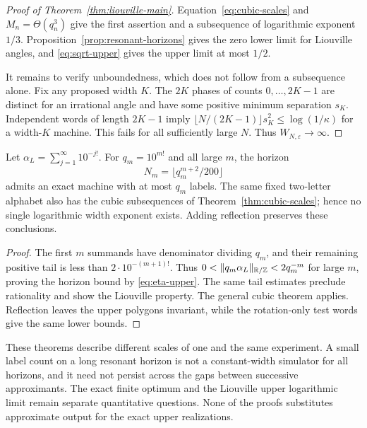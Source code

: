 \begin{proof}[Proof of Theorem~\ref{thm:liouville-main}]
Equation~\eqref{eq:cubic-scales} and $M_n=\Theta(q_n^3)$ give the first assertion and a subsequence of logarithmic exponent $1/3$. Proposition~\ref{prop:resonant-horizons} gives the zero lower limit for Liouville angles, and \eqref{eq:sqrt-upper} gives the upper limit at most $1/2$.

It remains to verify unboundedness, which does not follow from a subsequence alone. Fix any proposed width $K$. The $2K$ phases of counts $0,\ldots,2K-1$ are distinct for an irrational angle and have some positive minimum separation $s_K$. Independent words of length $2K-1$ imply
$\lfloor N/(2K-1)\rfloor s_K^2\le\log(1/\kappa)$ for a width-$K$ machine. This fails for all sufficiently large $N$. Thus $W_{N,\varepsilon}\to\infty$.
\end{proof}

\begin{corollary}\label{cor:liouville-explicit}
Let $\alpha_L=\sum_{j=1}^{\infty}10^{-j!}$. For $q_m=10^{m!}$ and all large $m$, the horizon
\[
                     N_m=\lfloor q_m^{m+2}/200\rfloor
\]
admits an exact machine with at most $q_m$ labels. The same fixed two-letter alphabet also has the cubic subsequences of Theorem~\ref{thm:cubic-scales}; hence no single logarithmic width exponent exists. Adding reflection preserves these conclusions.
\end{corollary}
\begin{proof}
The first $m$ summands have denominator dividing $q_m$, and their remaining positive tail is less than $2\cdot10^{-(m+1)!}$. Thus
$0<\lVert q_m\alpha_L\rVert_{\mathbb R/\mathbb Z}<2q_m^{-m}$ for large $m$, proving the horizon bound by \eqref{eq:eta-upper}. The same tail estimates preclude rationality and show the Liouville property. The general cubic theorem applies. Reflection leaves the upper polygons invariant, while the rotation-only test words give the same lower bounds.
\end{proof}

These theorems describe different scales of one and the same experiment. A small label count on a long resonant horizon is not a constant-width simulator for all horizons, and it need not persist across the gaps between successive approximants. The exact finite optimum and the Liouville upper logarithmic limit remain separate quantitative questions. None of the proofs substitutes approximate output for the exact upper realizations.
